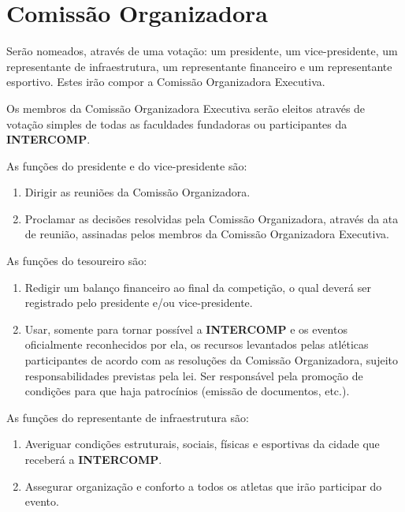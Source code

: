 {\let\clearpage\relax \chapter{Comissão Organizadora}}

\begin{article}
	Serão nomeados, através de uma votação: um presidente, um vice-presidente, um representante de infraestrutura, um representante financeiro e um representante esportivo. Estes irão compor a Comissão Organizadora Executiva.
\end{article}

\begin{article}
	Os membros da Comissão Organizadora Executiva serão eleitos através de votação simples de todas as faculdades fundadoras ou participantes da \textbf{INTERCOMP}.

	\begin{xparagraph}
		As funções do presidente e do vice-presidente são:
		\begin{enumerate}[noitemsep]
			\item Dirigir as reuniões da Comissão Organizadora.
			\item Proclamar as decisões resolvidas pela Comissão Organizadora, através da ata de reunião, assinadas pelos membros da Comissão Organizadora Executiva.
		\end{enumerate}
	\end{xparagraph}

	\begin{xparagraph}
		As funções do tesoureiro são:
		\begin{enumerate}[noitemsep]
			\item Redigir um balanço financeiro ao final da competição, o qual deverá ser registrado pelo presidente e/ou vice-presidente.
			\item Usar, somente para tornar possível a \textbf{INTERCOMP} e os eventos oficialmente reconhecidos por ela, os recursos levantados pelas atléticas participantes de acordo com as resoluções da Comissão Organizadora, sujeito responsabilidades previstas pela lei. Ser responsável pela promoção de condições para que haja patrocínios (emissão de documentos, etc.).
		\end{enumerate}
	\end{xparagraph}

	\begin{xparagraph}
		As funções do representante de infraestrutura são:
		\begin{enumerate}[noitemsep]
			\item Averiguar condições estruturais, sociais, físicas e esportivas da cidade que receberá a \textbf{INTERCOMP}.
			\item Assegurar organização e conforto a todos os atletas que irão participar do evento.
		\end{enumerate}
	\end{xparagraph}


\end{article}
